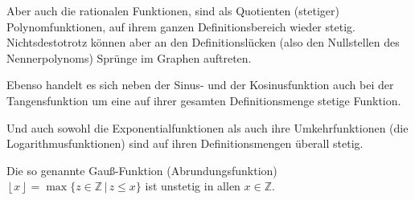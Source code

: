 Aber auch die rationalen Funktionen, sind als Quotienten (stetiger) Polynomfunktionen, auf ihrem ganzen Definitionsbereich wieder stetig. Nichtsdestotrotz können aber an den Definitionslücken (also den Nullstellen des Nennerpolynoms) Sprünge im Graphen auftreten.

Ebenso handelt es sich neben der Sinus- und der Kosinusfunktion auch bei der Tangensfunktion um eine auf ihrer gesamten Definitionsmenge stetige Funktion.

Und auch sowohl die Exponentialfunktionen als auch ihre Umkehrfunktionen (die Logarithmusfunktionen) sind auf ihren Definitionsmengen überall stetig.

Die so genannte Gau\ss-Funktion (Abrundungsfunktion) $\left\lfloor x \right\rfloor= \max \{z\in\mathbb{Z}  \, | \, z\le x\}$ ist unstetig in allen $x\in \mathbb{Z}$.

